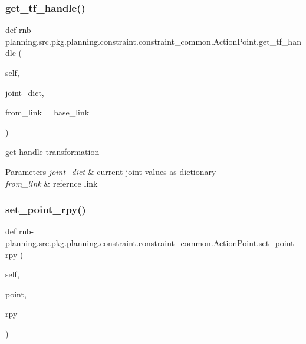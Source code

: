 \subsubsection{\texorpdfstring{get\+\_\+tf\+\_\+handle()}{get\_tf\_handle()}}
{\footnotesize\ttfamily def rnb-\/planning.\+src.\+pkg.\+planning.\+constraint.\+constraint\+\_\+common.\+Action\+Point.\+get\+\_\+tf\+\_\+handle (\begin{DoxyParamCaption}\item[{}]{self,  }\item[{}]{joint\+\_\+dict,  }\item[{}]{from\+\_\+link = {\ttfamily \textquotesingle{}base\+\_\+link\textquotesingle{}} }\end{DoxyParamCaption})}



get handle transformation 


\begin{DoxyParams}{Parameters}
{\em joint\+\_\+dict} & current joint values as dictionary \\
\hline
{\em from\+\_\+link} & refernce link \\
\hline
\end{DoxyParams}
\mbox{\label{classrnb-planning_1_1src_1_1pkg_1_1planning_1_1constraint_1_1constraint__common_1_1_action_point_a294d217f9163806e03652943931742f2}} 
\subsubsection{\texorpdfstring{set\+\_\+point\+\_\+rpy()}{set\_point\_rpy()}}
{\footnotesize\ttfamily def rnb-\/planning.\+src.\+pkg.\+planning.\+constraint.\+constraint\+\_\+common.\+Action\+Point.\+set\+\_\+point\+\_\+rpy (\begin{DoxyParamCaption}\item[{}]{self,  }\item[{}]{point,  }\item[{}]{rpy }\end{DoxyParamCaption})}


